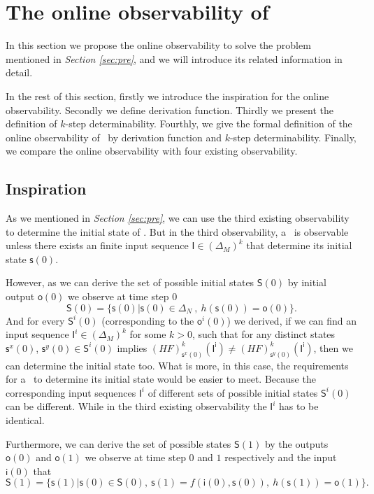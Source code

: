 \section{The online observability of \BCNs}
\label{sec:online}

In this section we propose the online observability to solve the problem mentioned in {\em Section \ref{sec:pre}}, and we will introduce its related information in detail. 

In the rest of this section, firstly we introduce the inspiration for the online observability. Secondly we define derivation function. Thirdly we present the definition of $k$-step determinability. Fourthly, we give the formal definition of the online observability of \BCNs\ by derivation function and $k$-step determinability. Finally, we compare the online observability with four existing observability.

\subsection{Inspiration}


As we mentioned in {\em Section \ref{sec:pre}}, we can use the third existing observability to determine the initial state of \BCN. But in the third observability, a \BCN\ is observable unless there exists an finite input sequence $\mathsf{I}\in(\Delta_M)^k$ that determine its initial state $\mathsf{s}(0)$. 

However, as we can derive the set of possible initial states $\mathsf{S}(0)$ by initial output $\mathsf{o}(0)$ we observe at time step $0$ 
\[\mathsf{S}(0)=\{\mathsf{s}(0)|\mathsf{s}(0)\in \Delta_N\ ,\ h( \mathsf{s}(0))=\mathsf{o}(0)\}.\]
And for every $\mathsf{S}^{i}(0)$ (corresponding to the $\mathsf{o}^{i}(0)$) we derived, if we can find an input sequence $\mathsf{I}^{i}\in(\Delta_M)^k$ for some $k>0$, such that for any distinct states $\mathsf{s}^{x}(0)$, $\mathsf{s}^{y}(0) \in \mathsf{S}^{i}(0)$ implies $(HF)^k_{\mathsf{s}^{x}(0)}(\mathsf{I^i})\neq (HF)^k_{\mathsf{s}^{y}(0)}(\mathsf{I^i})$,
then we can determine the initial state too. 
What is more, in this case, the requirements for a \BCN\ to determine its initial state would be easier to meet. Because the corresponding input sequences $\mathsf{I}^{i}$ of different sets of possible initial states $\mathsf{S}^{i}(0)$ can be different. While in the third existing observability the $\mathsf{I}^{i}$ has to be identical.

Furthermore, we can derive the set of possible states $\mathsf{S}(1)$ by the outputs $\mathsf{o}(0)$ and $\mathsf{o}(1)$ we observe at time step $0$ and $1$ respectively and the input $\mathsf{i}(0)$ that
\[\mathsf{S}(1)=\{\mathsf{s}(1)|\mathsf{s}(0)\in \mathsf{S}(0),\ \mathsf{s}(1)=f({\mathsf{i}(0)},{\mathsf{s}(0)}),\ h(\mathsf{s}(1))=\mathsf{o}(1)\}.\]

